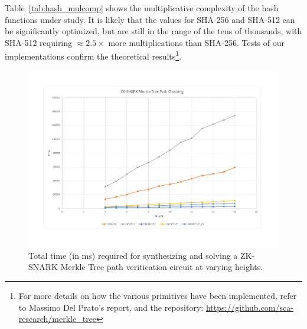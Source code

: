 Table~\ref{tab:hash_mulcomp} shows the multiplicative complexity of the hash functions under study.
It is likely that the values for SHA-256 and SHA-512 can be significantly optimized, but are still
in the range of the tens of thousands, with SHA-512 requiring \(\approx 2.5\times \) more
multiplications than SHA-256.
Tests of our implementations confirm the theoretical results\footnote{For more details on how the
	various primitives have been implemented, refer to Massimo Del Prato's report, and the repository: 
	\url{https://github.com/sca-research/merkle_tree}}.
\begin{figure}[t]
	\centering
	\includegraphics[scale=0.33]{res/mtree_total.pdf}
	\caption{Total time (in ms) required for synthesizing and solving a ZK-SNARK Merkle Tree path
		veritication circuit at varying heights.}\label{fig:mtree_total}
\end{figure}

